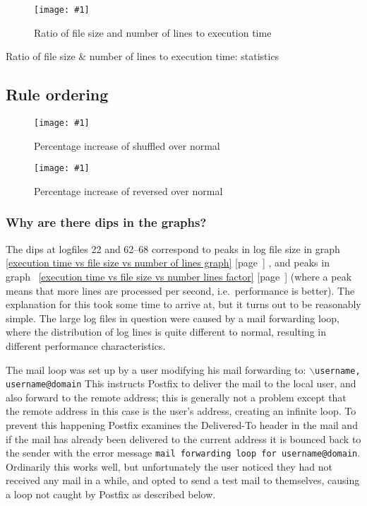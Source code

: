 \documentclass[a4paper,12pt,draft]{article}
\newcommand{\showgraph}[3]{
    \begin{figure}[hbt!]
        \caption{#2}\label{#3}
        \texttt{[image: \#1]}
    \end{figure}
}
\newcommand{\showtable}[3]{
    \begin{table}[ht]
        \caption{#2}\label{#3}
        
    \end{table}
}
\newcommand{\refwithpage}[1]{%
    \empty{}\ref{#1} [page~\pageref{#1}]%
}
\begin{document}
\showgraph{build/plot-normal-filesize-numlines-factor.ps}{Ratio of file
size and number of lines to execution time}{execution time vs file size vs
number lines factor}

\showtable{build/stats-normal-filesize-line-count-include}{Ratio of file
size \& number of lines to execution time: statistics}{execution time vs
file size vs number lines factor table}

\clearpage

\subsection{Rule ordering}

\label{rule ordering graphs}

\showgraph{build/plot-normal-shuffle-factor.ps}{Percentage increase of
shuffled over normal}{percentage increase of shuffled over normal}

\showgraph{build/plot-normal-reverse-factor.ps}{Percentage increase of
reversed over normal}{percentage increase of reversed over normal}

\subsubsection{Why are there dips in the graphs?}
\label{Why are there dips in the graphs?}

The dips at logfiles 22 and 62--68 correspond to peaks in log file size in
graph~\refwithpage{execution time vs file size vs number of lines graph},
and peaks in graph~\refwithpage{execution time vs file size vs number lines
factor} (where a peak means that more lines are processed per second, i.e.\
performance is better).  The explanation for this took some time to arrive
at, but it turns out to be reasonably simple.  The large log files in
question were caused by a mail forwarding loop, where the distribution of
log lines is quite different to normal, resulting in different performance
characteristics.

The mail loop was set up by a user modifying his mail forwarding to:
\newline \hspace*{2em}\texttt{$\backslash$username, username@domain}
\newline This instructs Postfix to deliver the mail to the local user, and
also forward to the remote address; this is generally not a problem except
that the remote address in this case is the user's address, creating an
infinite loop.  To prevent this happening Postfix examines the Delivered-To
header in the mail and if the mail has already been delivered to the
current address it is bounced back to the sender with the error message
\texttt{mail forwarding loop for username@domain}.  Ordinarily this works
well, but unfortunately the user noticed they had not received any mail in
a while, and opted to send a test mail to themselves, causing a loop not
caught by Postfix as described below.
\end{document}
